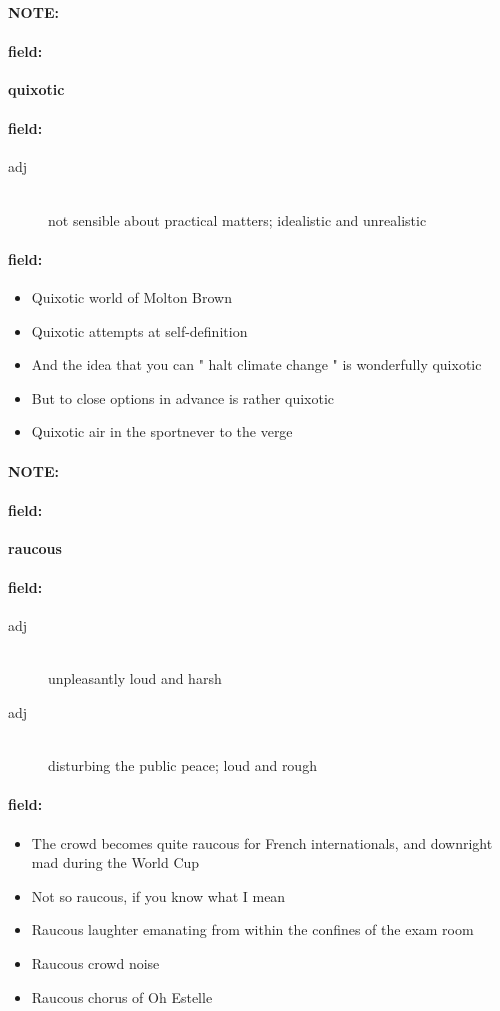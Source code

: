 \documentclass[12pt]{article}
\newenvironment{note}{\paragraph{NOTE:}}{}
\newenvironment{field}{\paragraph{field:}}{}
\begin{document}
\begin{note}
\begin{field}
\textbf{\large quixotic}
\end{field}


\begin{field}
\begin{description}
\item[adj] \hfill \\ 
not sensible about practical matters; idealistic and unrealistic

\end{description}
\end{field}

\begin{field}
\begin{itemize}
\item Quixotic world of Molton Brown
\item Quixotic attempts at self-definition
\item And the idea that you can " halt climate change " is wonderfully quixotic
\item But to close options in advance is rather quixotic
\item Quixotic air in the sportnever to the verge
\end{itemize}
\end{field}
\end{note}
\begin{note}
\begin{field}
\textbf{\large raucous}
\end{field}


\begin{field}
\begin{description}
\item[adj] \hfill \\ 
unpleasantly loud and harsh

\item[adj] \hfill \\ 
disturbing the public peace; loud and rough

\end{description}
\end{field}

\begin{field}
\begin{itemize}
\item The crowd becomes quite raucous for French internationals, and downright mad during the World Cup
\item Not so raucous, if you know what I mean
\item Raucous laughter emanating from within the confines of the exam room
\item Raucous crowd noise
\item Raucous chorus of Oh Estelle
\end{itemize}
\end{field}
\end{note}
\end{document}
